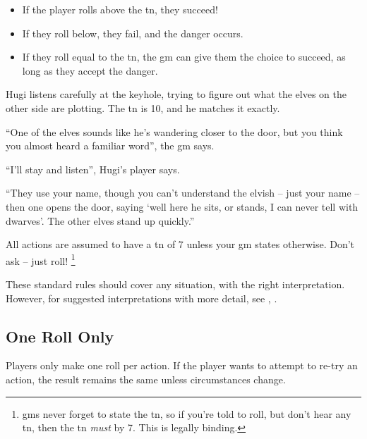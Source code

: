 \begin{multicols}{2}
\begin{multicols}{2}
\begin{itemize}

  \item
  If the player rolls above the \gls{tn}, they succeed!
  \item
  If they roll below, they fail, and the danger occurs.
  \item
  If they roll equal to the \gls{tn}, the \gls{gm} can give them the choice to succeed, as long as they accept the danger.

\end{itemize}

\columnbreak

\noindent
\TNChart

\end{multicols}

\begin{exampletext}
  Hugi listens carefully at the keyhole, trying to figure out what the elves on the other side are plotting.
  The \gls{tn} is 10, and he matches it exactly.

  ``One of the elves sounds like he's wandering closer to the door, but you think you almost heard a familiar word'', the \gls{gm} says.

  ``I'll stay and listen'', Hugi's player says.

  ``They use your name, though you can't understand the elvish -- just your name -- then one opens the door, saying `well here he sits, or stands, I can never tell with dwarves'.
  The other elves stand up quickly.''

\end{exampletext}

All actions are assumed to have a \gls{tn} of 7 unless your \gls{gm} states otherwise.
Don't ask -- just roll!%
\footnote{\Glspl{gm} never forget to state the \gls{tn}, so if you're told to roll, but don't hear any \gls{tn}, then the \gls{tn} \emph{must} by 7.
This is legally binding.}

These standard rules should cover any situation, with the right interpretation.
However, for suggested interpretations with more detail, see , .

\subsection{One Roll Only}

Players only make one roll per action.
If the player wants to attempt to re-try an action, the result remains the same unless circumstances change.


\end{multicols}
